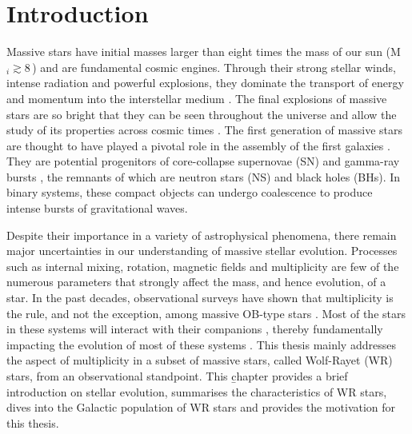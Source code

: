 \chapter{Introduction}\label{ch:introduction}


Massive stars have initial masses larger than eight times the mass of our sun (M$_i \gtrsim 8$\,\Msun{}) and are fundamental cosmic engines. Through their strong stellar winds, intense radiation and powerful explosions, they dominate the transport of energy and momentum into the interstellar medium \citep[][]{mac_low_distribution_2005}. The final explosions of massive stars are so bright that they can be seen throughout the universe and allow the study of its properties across cosmic times \citep{tanvir_-ray_2009}. The first generation of massive stars are thought to have played a pivotal role in the assembly of the first galaxies \citep{bromm_first_2004,robertson_early_2010}. They are potential progenitors of core-collapse supernovae (SN) and gamma-ray bursts \citep{woosley_supernova_2006}, the remnants of which are neutron stars (NS) and black holes (BHs). In binary systems, these compact objects can undergo coalescence to produce intense bursts of gravitational waves.

Despite their importance in a variety of astrophysical phenomena, there remain major uncertainties in our understanding of massive stellar evolution. Processes such as internal mixing, rotation, magnetic fields and multiplicity are few of the numerous parameters that strongly affect the mass, and hence evolution, of a star. In the past decades, observational surveys have shown that multiplicity is the rule, and not the exception, among massive OB-type stars \citep{mason_iccd_1998,mason_high_2009,sana_binary_2012,sana_vlt-flames_2013,sana_southern_2014,kobulnicky_toward_2014,barba_own_2014,dunstall_vlt-flames_2015,maiz_apellaniz_galactic_2016,maiz_apellaniz_monos_2019,almeida_tarantula_2017,banyard_observed_2022,villasenor_b-type_2021}. Most of the stars in these systems will interact with their companions \citep{fryer_constraints_2007,sana_binary_2012,sana_vlt-flames_2013,dunstall_vlt-flames_2015}, thereby fundamentally impacting the evolution of most of these systems \citep{paczynski_evolution_1967,pols_case_1994,1998Vanbeveren_popsynth,2014deMink_mergers}. This thesis mainly addresses the aspect of multiplicity in a subset of massive stars, called Wolf-Rayet (WR) stars, from an observational standpoint. This \b{chapter} provides a brief introduction on stellar evolution, summarises the characteristics of WR stars, dives into the Galactic population of WR stars and provides the motivation for this thesis.

